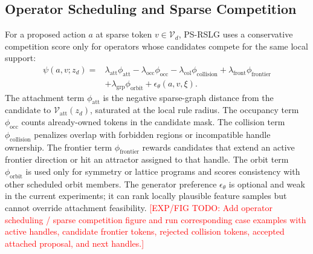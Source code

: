 \documentclass[sigconf,anonymous,review]{acmart}
\providecommand{\ExpFigTODO}[1]{\textcolor{red}{[EXP/FIG TODO: #1]}}
\begin{document}
\subsection{Operator Scheduling and Sparse Competition}
For a proposed action $a$ at sparse token $v\in\mathcal V_d$, PS-RSLG uses a conservative competition score only for operators whose candidates compete for the same local support:
\[
\begin{aligned}
\psi(a,v;z_d)=
{}&\lambda_{\mathrm{att}}\phi_{\mathrm{att}}
-\lambda_{\mathrm{occ}}\phi_{\mathrm{occ}}
-\lambda_{\mathrm{col}}\phi_{\mathrm{collision}}
+\lambda_{\mathrm{front}}\phi_{\mathrm{frontier}}
{}\\
&+\lambda_{\mathrm{grp}}\phi_{\mathrm{orbit}}
+\epsilon_{\theta}(a,v,\xi).
\end{aligned}
\]
The attachment term $\phi_{\mathrm{att}}$ is the negative sparse-graph distance from the candidate to $\mathcal V_{\mathrm{att}}(z_d)$, saturated at the local rule radius. The occupancy term $\phi_{\mathrm{occ}}$ counts already-owned tokens in the candidate mask. The collision term $\phi_{\mathrm{collision}}$ penalizes overlap with forbidden regions or incompatible handle ownership. The frontier term $\phi_{\mathrm{frontier}}$ rewards candidates that extend an active frontier direction or hit an attractor assigned to that handle. The orbit term $\phi_{\mathrm{orbit}}$ is used only for symmetry or lattice programs and scores consistency with other scheduled orbit members. The generator preference $\epsilon_{\theta}$ is optional and weak in the current experiments; it can rank locally plausible feature samples but cannot override attachment feasibility. \ExpFigTODO{Add operator scheduling / sparse competition figure and run corresponding case examples with active handles, candidate frontier tokens, rejected collision tokens, accepted attached proposal, and next handles.}
\end{document}
